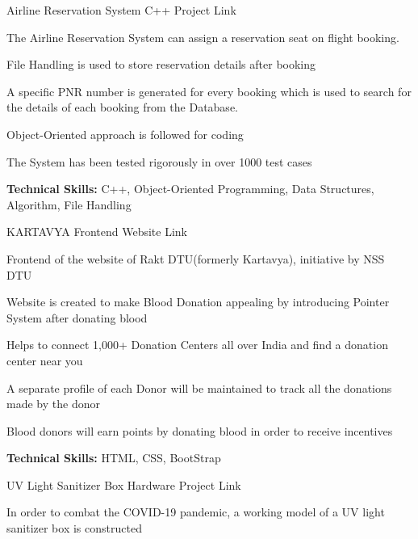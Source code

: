 \begin{cventries}
  \cventry
    {} %
    {Airline Reservation System} %
    {C++ Project} %
    {Link} %
    {
      \begin{cvitems} %
        \item {The Airline Reservation System can assign a reservation seat on flight booking.}
        \item {File Handling is used to store reservation details after booking}
        \item {A specific PNR number is generated for every booking which is used to search for the details of each booking from the Database.}
        \item {Object-Oriented approach is followed for coding}
        \item {The System has been tested rigorously in over 1000 test cases}
        \item {\textbf{Technical Skills:} C++, Object-Oriented Programming, Data Structures, Algorithm, File Handling}
      \end{cvitems}
    }
  \cventry
    {} %
    {KARTAVYA} %
    {Frontend Website} %
    {Link}%
    {
      \begin{cvitems} %
        \item{Frontend of the website of Rakt DTU(formerly Kartavya), initiative by NSS DTU}
        \item {Website is created to make Blood Donation appealing by introducing Pointer System after donating blood}
        \item {Helps to connect 1,000+ Donation Centers all over India and find a donation center near you}
        \item {A separate profile of each Donor will be maintained to track all the donations made by the donor}
        \item {Blood donors will earn points by donating blood in order to receive incentives}
        \item {\textbf{Technical Skills:} HTML, CSS, BootStrap}
      \end{cvitems}
    }
  \cventry
    {} %
    {UV Light Sanitizer Box} %
    {Hardware Project} %
    {Link} %
    {
      \begin{cvitems} %
        \item {In order to combat the COVID-19 pandemic, a working model of a UV light sanitizer box is constructed}

\end{cvitems}}
\end{cventries}
